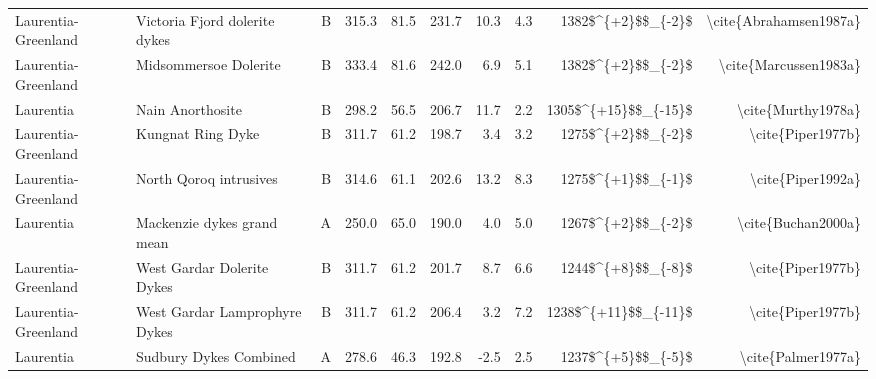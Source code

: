 \begin{longtable}{p{1 in}p{1 in}rrrrrrrr}
           Laurentia-Greenland &                    Victoria Fjord dolerite dykes &      B &     315.3 &      81.5 & 231.7 &  10.3 &       4.3 &     1382\$\textasciicircum \{+2\}\$\$\_\{-2\}\$ &                             \textbackslash cite\{Abrahamsen1987a\} \\
           Laurentia-Greenland &                            Midsommersoe Dolerite &      B &     333.4 &      81.6 & 242.0 &   6.9 &       5.1 &     1382\$\textasciicircum \{+2\}\$\$\_\{-2\}\$ &                              \textbackslash cite\{Marcussen1983a\} \\
                     Laurentia &                                 Nain Anorthosite &      B &     298.2 &      56.5 & 206.7 &  11.7 &       2.2 &   1305\$\textasciicircum \{+15\}\$\$\_\{-15\}\$ &                                 \textbackslash cite\{Murthy1978a\} \\
           Laurentia-Greenland &                                Kungnat Ring Dyke &      B &     311.7 &      61.2 & 198.7 &   3.4 &       3.2 &     1275\$\textasciicircum \{+2\}\$\$\_\{-2\}\$ &                                  \textbackslash cite\{Piper1977b\} \\
           Laurentia-Greenland &                           North Qoroq intrusives &      B &     314.6 &      61.1 & 202.6 &  13.2 &       8.3 &     1275\$\textasciicircum \{+1\}\$\$\_\{-1\}\$ &                                  \textbackslash cite\{Piper1992a\} \\
                     Laurentia &                       Mackenzie dykes grand mean &      A &     250.0 &      65.0 & 190.0 &   4.0 &       5.0 &     1267\$\textasciicircum \{+2\}\$\$\_\{-2\}\$ &                                 \textbackslash cite\{Buchan2000a\} \\
           Laurentia-Greenland &                       West Gardar Dolerite Dykes &      B &     311.7 &      61.2 & 201.7 &   8.7 &       6.6 &     1244\$\textasciicircum \{+8\}\$\$\_\{-8\}\$ &                                  \textbackslash cite\{Piper1977b\} \\
           Laurentia-Greenland &                    West Gardar Lamprophyre Dykes &      B &     311.7 &      61.2 & 206.4 &   3.2 &       7.2 &   1238\$\textasciicircum \{+11\}\$\$\_\{-11\}\$ &                                  \textbackslash cite\{Piper1977b\} \\
                     Laurentia &                           Sudbury Dykes Combined &      A &     278.6 &      46.3 & 192.8 &  -2.5 &       2.5 &     1237\$\textasciicircum \{+5\}\$\$\_\{-5\}\$ &                                 \textbackslash cite\{Palmer1977a\} \\

\end{longtable}
